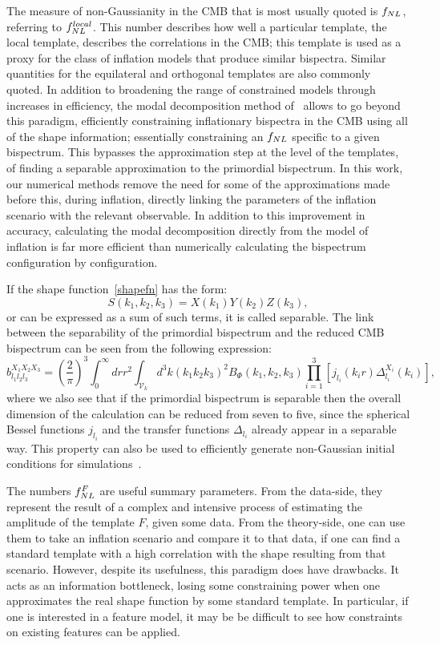The measure of non-Gaussianity in the CMB that is
most usually quoted is $f_{NL}$, referring to $f^{local}_{NL}$.
This number describes how well a particular template, the local template,
describes the correlations in the CMB;
this template is used as a proxy for the class of inflation models that produce similar bispectra.
Similar quantities for the equilateral and orthogonal templates are also
commonly quoted.
In addition to broadening the range of constrained models through increases in efficiency,
the modal decomposition method of~\cite{FergShell_1,FergShell_2,FergShell_3}
allows to go beyond this paradigm, efficiently constraining inflationary bispectra in the CMB using
all of the shape information; essentially constraining an $f_{NL}$
specific to a given bispectrum. This bypasses the approximation step at the level of the templates,
of finding a separable approximation to the primordial bispectrum.
In this work, our numerical methods remove the need for some of the approximations
made before this, during inflation, directly linking the parameters of the inflation scenario
with the relevant observable.
In addition to this improvement in accuracy, calculating the modal decomposition
directly from the model of inflation is far more efficient 
than numerically calculating the bispectrum configuration by configuration.


If the shape function~\eqref{shapefn} has the form:
\begin{equation}\label{sepXYZ}
S(k_1,k_2,k_3) = X(k_1)Y(k_2)Z(k_3),
\end{equation}
or can be expressed as a sum of such terms,
it is called separable.
The link between the separability of the primordial bispectrum
and the reduced CMB bispectrum can be seen from the following expression:
\begin{equation}
\label{eq:reduced_cmb}
b^{X_1X_2X_3}_{l_1l_2l_3} = \left(\frac{2}{\pi}\right)^3\int_{0}^{\infty}drr^2\int_{\mathcal{V}_k}d^3k (k_1k_2k_3)^2 B_{\Phi}(k_1,k_2,k_3)\prod_{i=1}^{3}\left[j_{l_i}(k_ir)\Delta^{X_i}_{l_i}(k_i)\right],
\end{equation}
where we also see that if the primordial bispectrum is separable
then the overall dimension
of the calculation can be reduced from seven to five, 
since the spherical Bessel functions $j_{l_i}$ and the
transfer functions $\Delta_{l_i}$ already appear in a separable way.
This property can also be used to
efficiently generate non-Gaussian initial conditions
for simulations~\cite{Scoccimarro_2012}.


The numbers $f_{NL}^F$ are useful summary parameters.
From the data-side, they represent the result of
a complex and intensive process
of estimating the amplitude of the template $F$,
given some data. From the theory-side, one
can use them to take an inflation scenario and compare it
to that data, if one can find a standard template
with a high correlation with the shape resulting
from that scenario.
However, despite its usefulness, this paradigm does
have drawbacks. It acts as an information bottleneck,
losing some constraining power when one approximates
the real shape function by some standard template.
In particular, if one is interested in a feature model,
it may be be difficult to see how constraints on existing
features can be applied.
\newpage
